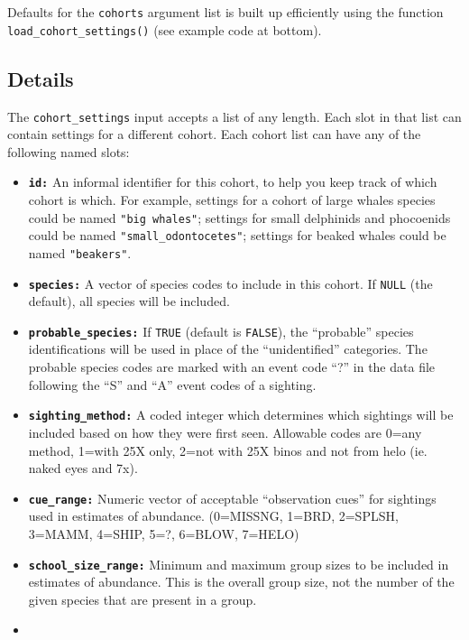 \documentclass[
]{book}
\begin{document}
Defaults for the \texttt{cohorts} argument list is built up efficiently using the function \texttt{load\_cohort\_settings()} (see example code at bottom).

\hypertarget{details-1}{%
\subsection*{Details}\label{details-1}}

The \texttt{cohort\_settings} input accepts a list of any length. Each slot in that list can contain settings for a different cohort. Each cohort list can have any of the following named slots:

\begin{itemize}
\item
  \textbf{\texttt{id:}} An informal identifier for this cohort, to help you keep track of which cohort is which. For example, settings for a cohort of large whales species could be named \texttt{"big\ whales"}; settings for small delphinids and phocoenids could be named \texttt{"small\_odontocetes"}; settings for beaked whales could be named \texttt{"beakers"}.
\item
  \textbf{\texttt{species:}} A vector of species codes to include in this cohort. If \texttt{NULL} (the default), all species will be included.
\item
  \textbf{\texttt{probable\_species:}} If \texttt{TRUE} (default is \texttt{FALSE}), the ``probable'' species identifications will be used in place of the ``unidentified'' categories. The probable species codes are marked with an event code ``?'' in the data file following the ``S'' and ``A'' event codes of a sighting.
\item
  \textbf{\texttt{sighting\_method:}} A coded integer which determines which sightings will be included based on how they were first seen. Allowable codes are 0=any method, 1=with 25X only, 2=not with 25X binos and not from helo (ie. naked eyes and 7x).
\item
  \textbf{\texttt{cue\_range:}} Numeric vector of acceptable ``observation cues'' for sightings used in estimates of abundance. (0=MISSNG, 1=BRD, 2=SPLSH, 3=MAMM, 4=SHIP, 5=?, 6=BLOW, 7=HELO)
\item
  \textbf{\texttt{school\_size\_range:}} Minimum and maximum group sizes to be included in estimates of abundance. This is the overall group size, not the number of the given species that are present in a group.
\item

\end{itemize}
\end{document}
